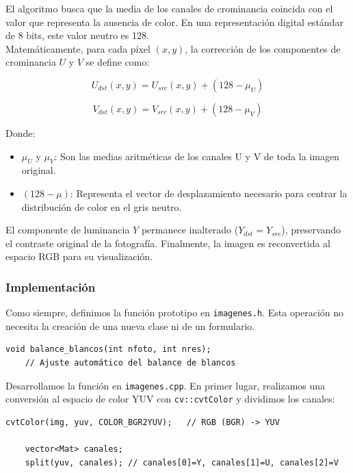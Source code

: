 \documentclass[11pt]{article}
\begin{document}
          El algoritmo busca que la media de los canales de crominancia coincida con el
          valor que representa la ausencia de color. En una representación digital
          estándar de 8 bits, este valor neutro es 128. \\

          \noindent
          Matemáticamente, para cada píxel $(x,y)$, la corrección de los componentes de
          crominancia $U$ y $V$ se define como:

          \[ U_{dst}(x,y) = U_{src}(x,y) + (128 - \mu_U) \]

          \[ V_{dst}(x,y) = V_{src}(x,y) + (128 - \mu_V) \]

          \noindent
          Donde:
          \begin{itemize}
              \item $\mu_U$ y $\mu_V$: Son las medias aritméticas de los canales U y V de toda la imagen original.
              \item $(128 - \mu)$: Representa el vector de desplazamiento necesario para centrar la distribución de color en el gris neutro.
          \end{itemize}

          El componente de luminancia $Y$ permanece inalterado ($Y_{dst} = Y_{src}$),
          preservando el contraste original de la fotografía. Finalmente, la imagen es
          reconvertida al espacio RGB para su visualización.

          \clearpage

      \subsubsection{Implementación}

          \noindent
          Como siempre, definimos la función prototipo en \texttt{imagenes.h}. Esta operación no necesita la creación de una nueva clase ni de un formulario.

          \begin{lstlisting}[style=CppQtStyle]
    void balance_blancos(int nfoto, int nres);
    // Ajuste automático del balance de blancos
\end{lstlisting}

          \noindent
          Desarrollamos la función en \texttt{imagenes.cpp}. En primer lugar, realizamos una conversión al espacio de color YUV con \texttt{cv::cvtColor} y dividimos los canales:

          \begin{lstlisting}[style=CppQtStyle]
    cvtColor(img, yuv, COLOR_BGR2YUV);   // RGB (BGR) -> YUV

    vector<Mat> canales;
    split(yuv, canales); // canales[0]=Y, canales[1]=U, canales[2]=V
\end{lstlisting}
\end{document}
